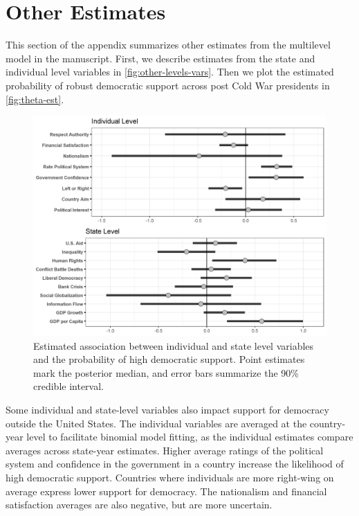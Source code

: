 \documentclass[12pt]{article}
\begin{document}
\section{Other Estimates}


This section of the appendix summarizes other estimates from the multilevel model in the manuscript. 
First, we describe estimates from the state and individual level variables in \autoref{fig:other-levels-vars}. 
Then we plot the estimated probability of robust democratic support across post Cold War presidents in \autoref{fig:theta-est}. 


\begin{figure}
\includegraphics[width = .95\textwidth]{other-levels-vars.png}
\caption{Estimated association between individual and state level variables and the probability of high democratic support. Point estimates mark the posterior median, and error bars summarize the 90\% credible interval.}
\label{fig:other-levels-vars} 
\end{figure}


Some individual and state-level variables also impact support for democracy outside the United States. 
The individual variables are averaged at the country-year level to facilitate binomial model fitting, as the individual estimates compare averages across state-year estimates.
Higher average ratings of the political system and confidence in the government in a country increase the likelihood of high democratic support. 
Countries where individuals are more right-wing on average express lower support for democracy. 
The nationalism and financial satisfaction averages are also negative, but are more uncertain.
\end{document}
